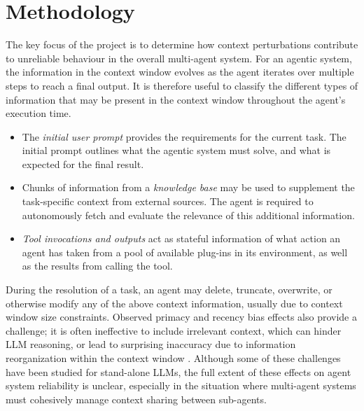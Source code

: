 \documentclass[conference]{IEEEtran}
\begin{document}
\section{Methodology}
The key focus of the project is to determine how context perturbations contribute
to unreliable behaviour in the overall multi-agent system.
For an agentic system, the information in the context window evolves as the agent iterates over
multiple steps to reach a final output.
It is therefore useful to classify the different types of information that may be present in the
context window throughout the agent's execution time.
\begin{itemize}
	\item The \emph{initial user prompt} provides the requirements for the current task. The initial
		prompt outlines what the agentic system must solve, and what is expected for the final result.
	\item Chunks of information from a \emph{knowledge base} may be used to supplement the
		task-specific context from external sources. The agent is required to autonomously fetch and
		evaluate the relevance of this additional information.
	\item \emph{Tool invocations and outputs} act as stateful information of what action an agent
		has taken from a pool of available plug-ins in its environment,
		as well as the results from calling the tool.
\end{itemize}
During the resolution of a task, an agent may delete, truncate, overwrite, or otherwise modify any
of the above context information, usually due to context window size constraints.
Observed primacy and recency bias effects also provide a challenge; it is often ineffective
to include irrelevant context, which can hinder LLM reasoning, or lead to surprising inaccuracy due
to information reorganization within the context window \cite{liu_lost_nodate}.
Although some of these challenges have been studied for stand-alone LLMs, the full extent of these
effects on agent system reliability is unclear, especially in the situation where multi-agent
systems must cohesively manage context sharing between sub-agents.
\end{document}
